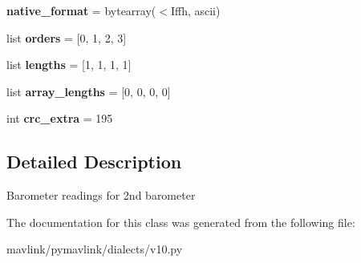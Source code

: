 \begin{DoxyCompactItemize}
{\bfseries native\+\_\+format} = bytearray(\textquotesingle{}$<$Iffh\textquotesingle{}, \textquotesingle{}ascii\textquotesingle{})
\item 
\mbox{\label{classpymavlink_1_1dialects_1_1v10_1_1MAVLink__scaled__pressure2__message_ac0350b2f81fb80ca50a9fcf6cced46f3}} 
list {\bfseries orders} = \mbox{[}0, 1, 2, 3\mbox{]}
\item 
\mbox{\label{classpymavlink_1_1dialects_1_1v10_1_1MAVLink__scaled__pressure2__message_acdf382290168eabe20d54b5b6de5c088}} 
list {\bfseries lengths} = \mbox{[}1, 1, 1, 1\mbox{]}
\item 
\mbox{\label{classpymavlink_1_1dialects_1_1v10_1_1MAVLink__scaled__pressure2__message_aa80858aa30bc1730696516516d11d41d}} 
list {\bfseries array\+\_\+lengths} = \mbox{[}0, 0, 0, 0\mbox{]}
\item 
\mbox{\label{classpymavlink_1_1dialects_1_1v10_1_1MAVLink__scaled__pressure2__message_a254e6943f3fff0a3567489277d70eb75}} 
int {\bfseries crc\+\_\+extra} = 195
\end{DoxyCompactItemize}


\subsection{Detailed Description}
\begin{DoxyVerb}Barometer readings for 2nd barometer
\end{DoxyVerb}
 

The documentation for this class was generated from the following file\+:\begin{DoxyCompactItemize}
\item 
mavlink/pymavlink/dialects/v10.\+py\end{DoxyCompactItemize}
